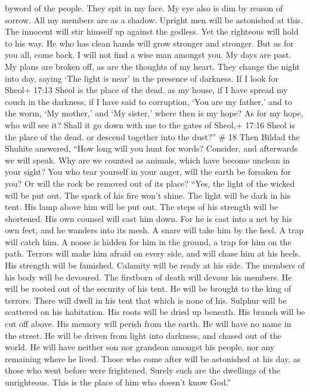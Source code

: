 byword of the people. They spit in my face.  My eye also is
dim by reason of sorrow. All my members are as a shadow. 
Upright men will be astonished at this. The innocent will stir himself
up against the godless.  Yet the righteous will hold to his
way. He who has clean hands will grow stronger and stronger.
 But as for you all, come back. I will not find a wise man
amongst you.  My days are past. My plans are broken off, as
are the thoughts of my heart.  They change the night into
day, saying `The light is near' in the presence of darkness.
 If I look for Sheol+ 17:13 Sheol is the place of the dead.
as my house, if I have spread my couch in the darkness,  if
I have said to corruption, `You are my father,' and to the worm, `My
mother,' and `My sister,'  where then is my hope? As for my
hope, who will see it?  Shall it go down with me to the
gates of Sheol,+ 17:16 Sheol is the place of the dead. or descend
together into the dust?'' \# 18  Then Bildad the Shuhite
answered,  ``How long will you hunt for words? Consider, and
afterwards we will speak.  Why are we counted as animals,
which have become unclean in your sight?  You who tear
yourself in your anger, will the earth be forsaken for you? Or will the
rock be removed out of its place?  ``Yes, the light of the
wicked will be put out. The spark of his fire won't shine. 
The light will be dark in his tent. His lamp above him will be put out.
 The steps of his strength will be shortened. His own
counsel will cast him down.  For he is cast into a net by
his own feet, and he wanders into its mesh.  A snare will
take him by the heel. A trap will catch him.  A noose is
hidden for him in the ground, a trap for him on the path. 
Terrors will make him afraid on every side, and will chase him at his
heels.  His strength will be famished. Calamity will be
ready at his side.  The members of his body will be
devoured. The firstborn of death will devour his members. 
He will be rooted out of the security of his tent. He will be brought to
the king of terrors.  There will dwell in his tent that
which is none of his. Sulphur will be scattered on his habitation.
 His roots will be dried up beneath. His branch will be cut
off above.  His memory will perish from the earth. He will
have no name in the street.  He will be driven from light
into darkness, and chased out of the world.  He will have
neither son nor grandson amongst his people, nor any remaining where he
lived.  Those who come after will be astonished at his day,
as those who went before were frightened.  Surely such are
the dwellings of the unrighteous. This is the place of him who doesn't
know God.''

